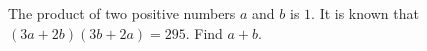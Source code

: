 The product of two positive numbers $a$ and $b$ is $1$. It is known that $(3a+2b)(3b+2a)=295$. Find $a+b$.
